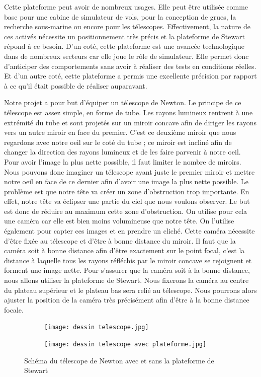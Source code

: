 \documentclass[a4paper,12pt]{article}
\begin{document}
\medskip

Cette plateforme peut avoir de nombreux usages. 
Elle peut être utilisée comme base pour une cabine de simulateur de vols, pour la conception de grues, la recherche
sous-marine ou encore pour les télescopes. 
Effectivement, la nature de ces activés nécessite un positionnement très précis et la plateforme de
Stewart répond à ce besoin. 
D’un coté, cette plateforme est une avancée technologique dans de nombreux secteurs car elle joue le rôle de simulateur. Elle permet donc d’anticiper des comportements sans avoir à réaliser des
tests en conditions réelles. Et d’un autre coté, cette plateforme a permis une excellente précision par rapport à ce qu'il était possible de réaliser auparavant.

\medskip

Notre projet a pour but d’équiper un télescope de Newton. 
Le principe de ce télescope est assez simple, en forme de tube. 
Les rayons lumineux rentrent à une extrémité du tube et sont projetés sur un miroir concave afin de diriger les rayons vers un autre miroir en face du premier. 
C’est ce deuxième miroir que nous regardons avec notre oeil sur le coté du tube ; ce miroir est incliné afin de changer la direction des rayons lumineux et de les faire parvenir à notre oeil. 
Pour avoir l’image la plus nette possible, il faut limiter le nombre de miroirs. 
Nous pouvons donc imaginer un télescope ayant juste le premier miroir et mettre notre oeil en face de ce dernier afin d’avoir une image la plus nette possible. 
Le problème est que notre tête va créer un zone d’obstruction trop importante. 
En effet, notre tête va éclipser une partie du ciel que nous voulons observer. 
Le but est donc de réduire au maximum cette zone d’obstruction. 
On utilise pour cela une caméra car elle est bien moins volumineuse que notre tête. 
On l’utilise également pour capter ces images et en prendre un cliché. 
Cette caméra nécessite d’être fixée au télescope et d’être à bonne distance du miroir. 
Il faut que la caméra soit à bonne distance afin d’être exactement sur le point focal, c’est la distance à laquelle tous les rayons réfléchis par le miroir concave se rejoignent et forment une image nette. 
Pour s’assurer que la caméra soit à la bonne distance, nous allons utiliser la plateforme de Stewart. 
Nous fixerons la caméra au centre du plateau supérieur et le plateau bas sera relié au télescope. 
Nous pourrons alors ajuster la position de la caméra très précisément afin d’être à la bonne distance focale. 

\begin{figure}[H]
    \centering
    \begin{subfigure}[]{0.4\textwidth}
        \texttt{[image: dessin telescope.jpg]}
    \end{subfigure}
    \begin{subfigure}[]{0.4\textwidth}
        \texttt{[image: dessin telescope avec plateforme.jpg]}
    \end{subfigure}
    \caption{Schéma du télescope de Newton avec et sans la plateforme de Stewart}
\end{figure}
\end{document}
